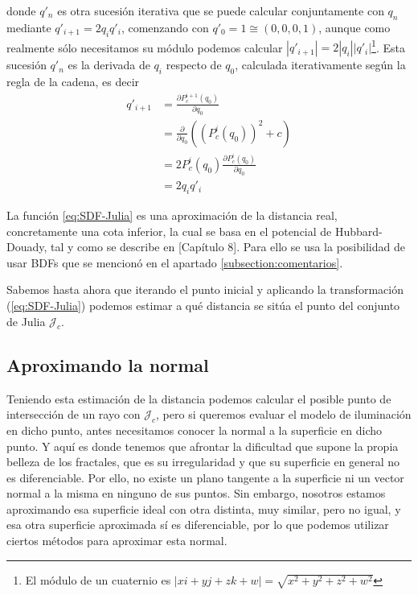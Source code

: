 donde $q'_n$ es otra sucesión iterativa que se puede calcular conjuntamente con $q_n$ mediante $q'_{i+1}=2q_i q'_i$, comenzando con $q'_0=1\cong(0,0,0,1)$, aunque como realmente sólo necesitamos su módulo podemos calcular $|q'_{i+1}|=2|q_i||q'_i|$\footnote{El módulo de un cuaternio es $|xi+yj+zk+w|=\sqrt{x^2+y^2+z^2+w^2}$}. Esta sucesión $q'_n$ es la derivada de $q_i$ respecto de $q_0$, calculada iterativamente según la regla de la cadena, es decir
\begin{equation}
    \begin{split}
        q'_{i+1}&=\frac{\partial P^{i+1}_c(q_0)}{\partial q_0}\\
        &= \frac{\partial}{\partial q_0}\left((P_c^i(q_0))^2+c\right)\\
        &= 2 P_c^i(q_0)\frac{\partial P_c^i(q_0)}{\partial q_0}\\
        &= 2 q_i q'_i
    \end{split}
\end{equation}

La función \ref{eq:SDF-Julia} es una aproximación de la distancia real, concretamente una cota inferior, la cual se basa en el potencial de Hubbard-Douady, tal y como se describe en \cite{Hubbard-Douady}[Capítulo 8]. Para ello se usa la posibilidad de usar BDFs que se mencionó en el apartado \ref{subsection:comentarios}.

Sabemos hasta ahora que iterando el punto inicial y aplicando la transformación (\ref{eq:SDF-Julia}) podemos estimar a qué distancia se sitúa el punto del conjunto de Julia $\mathcal{J}_c$. 

\subsection{Aproximando la normal}
\label{subsection:normal-sdf}

Teniendo esta estimación de la distancia podemos calcular el posible punto de intersección de un rayo con $\mathcal{J}_c$, pero si queremos evaluar el modelo de iluminación en dicho punto, antes necesitamos conocer la normal a la superficie en dicho punto. Y aquí es donde tenemos que afrontar la dificultad que supone la propia belleza de los fractales, que es su irregularidad y que su superficie en general no es diferenciable. Por ello, no existe un plano tangente a la superficie ni un vector normal a la misma en ninguno de sus puntos. Sin embargo, nosotros estamos aproximando esa superficie ideal con otra distinta, muy similar, pero no igual, y esa otra superficie aproximada sí es diferenciable, por lo que podemos utilizar ciertos métodos para aproximar esta normal.

